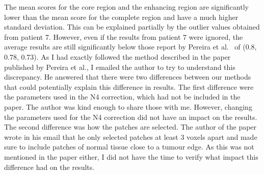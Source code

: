 \documentclass[12pt,a4paper,twoside,openright]{report}
\begin{document}
The mean scores for the core region and the enhancing region are significantly lower than the mean score for the complete region and have a much higher standard deviation. This can be explained partially by the outlier values obtained from patient 7. However, even if the results from patient 7 were ignored, the average results are still significantly below those report by Pereira et al.\ \cite{pereira} of (0.8, 0.78, 0.73). As I had exactly followed the method described in the paper published by Pereira et al., I emailed the author to try to understand this discrepancy. He answered that there were two differences between our methods that could potentially explain this difference in results. The first difference were the parameters used in the N4 correction, which had not be included in the paper. The author was kind enough to share those with me. However, changing the parameters used for the N4 correction did not have an impact on the results. The second difference was how the patches are selected. The author of the paper wrote in his email that he only selected patches at least 3 voxels apart and made sure to include patches of normal tissue close to a tumour edge. As this was not mentioned in the paper either, I did not have the time to verify what impact this difference had on the results.
\end{document}
